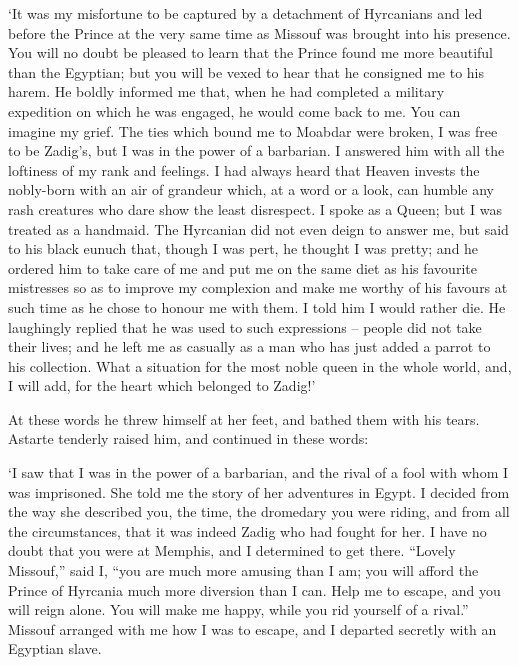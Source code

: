 \documentclass{article}
\begin{document}
\begin{center}
`It was my misfortune to be captured by a detachment of Hyrcanians and led before 
the Prince at the very same time as Missouf was brought into his presence. You 
will no doubt be pleased to learn that the Prince found me more beautiful than 
the Egyptian; but you will be vexed to hear that he consigned me to his harem. 
He boldly informed me that, when he had completed a military expedition on which 
he was engaged, he would come back to me. You can imagine my grief. The ties which 
bound me to Moabdar were broken, I was free to be Zadig's, but I was in the power 
of a barbarian. I answered him with all the loftiness of my rank and feelings. 
I had always heard that Heaven invests the nobly-born with an air of grandeur which, 
at a word or a look, can humble any rash creatures who dare show the least disrespect. 
I spoke as a Queen; but I was treated as a handmaid. The Hyrcanian did not even 
deign to answer me, but said to his black eunuch that, though I was pert, he thought 
I was pretty; and he ordered him to take care of me and put me on the same diet 
as his favourite mistresses so as to improve my complexion and make me worthy of 
his favours at such time as he chose to honour me with them. I told him I would 
rather die. He laughingly replied that he was used to such expressions – people 
did not take their lives; and he left me as casually as a man who has just added 
a parrot to his collection. What a situation for the most noble queen in the whole 
world, and, I will add, for the heart which belonged to Zadig!' 

At these words he threw himself at her feet, and bathed them with his tears. Astarte 
tenderly raised him, and continued in these words: 

`I saw that I was in the power of a barbarian, and the rival of a fool with whom 
I was imprisoned. She told me the story of her adventures in Egypt. I decided from 
the way she described you, the time, the dromedary you were riding, and from all 
the circumstances, that it was indeed Zadig who had fought for her. I have no doubt 
that you were at Memphis, and I determined to get there. ``Lovely Missouf,'' said 
I, ``you are much more amusing than I am; you will afford the Prince of Hyrcania 
much more diversion than I can. Help me to escape, and you will reign alone. You 
will make me happy, while you rid yourself of a rival.'' Missouf arranged with 
me how I was to escape, and I departed secretly with an Egyptian slave. 


\end{center}
\end{document}
